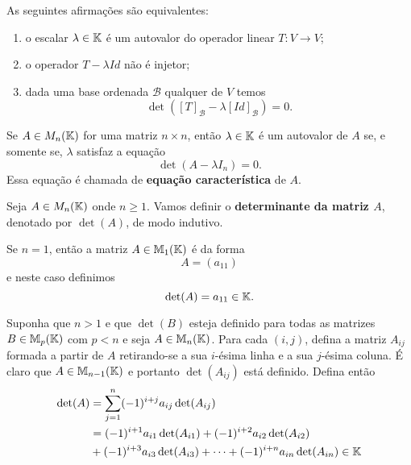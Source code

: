 \documentclass{beamer}
\begin{document}
    \begin{frame}
        \begin{teorema}
            As seguintes afirmações são equivalentes:
            \begin{enumerate}[label={\roman*})]
                \item o escalar $\lambda \in \mathbb{K}$ é um autovalor do operador linear $T \colon V \to V$;

                \item o operador $T - \lambda Id$ não é injetor;

                \item dada uma base ordenada $\mathcal{B}$ qualquer de $V$ temos
                \[
                \det([T]_\mathcal{B} - \lambda[Id]_\mathcal{B}) = 0.
                \]
            \end{enumerate}
        \end{teorema}
    \end{frame}

    \begin{frame}
        \begin{teorema}
            Se $A \in M_n(\mathbb{K})$ for uma matriz $n \times n$, então $\lambda \in \mathbb{K}$ é um autovalor de $A$ se, e somente se, $\lambda$ satisfaz a equação
            \[
            \det(A - \lambda I_n) = 0.
            \]
            Essa equação é chamada de \textbf{equação característica} de $A$.
        \end{teorema}
    \end{frame}

    \begin{frame}
        Seja $A \in M_n(\mathbb{K})$ onde $n \ge 1$. Vamos definir o \textbf{determinante da matriz $A$}, denotado por $\det(A)$, de modo indutivo.

        Se $n = 1$, então a matriz $A \in \mathbb{M}_1(\mathbb{K})$ é da forma
        \[
        A = (a_{11})
        \]
        e neste caso definimos
        \[
        \det(A) = a_{11} \in \mathbb{K}.
        \]
    \end{frame}

\begin{frame}
        Suponha que $n > 1$ e que $\det(B)$ esteja definido para todas as matrizes $B \in \mathbb{M}_p(\mathbb{K})$ com $p < n$ e seja $A \in \mathbb{M}_n(\mathbb{K})$. Para cada $(i,j)$, defina a matriz $A_{ij}$ formada a partir de $A$ retirando-se a sua $i$-ésima linha e a sua $j$-ésima coluna. É claro que $A \in \mathbb{M}_{n - 1}(\mathbb{K})$ e portanto $\det(A_{ij})$ está definido. Defina então
        \begin{align*}
            \det(A) &= \sum_{j = 1}^n(-1)^{i + j}a_{ij}\det(A_{ij}) \\ &= (-1)^{i + 1}a_{i1}\det(A_{i1}) + (-1)^{i + 2}a_{i2}\det(A_{i2}) \\ & + (-1)^{i + 3}a_{i3}\det(A_{i3}) + \cdots + (-1)^{i + n}a_{in}\det(A_{in}) \in \mathbb{K}
        \end{align*}
    \end{frame}
\end{document}
